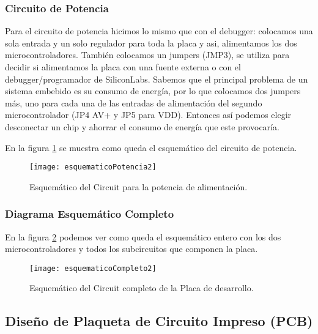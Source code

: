 \subsubsection{Circuito de Potencia}
\label{subsub: circuito_potencia2}

Para el circuito de potencia hicimos lo mismo que con el debugger: colocamos una sola entrada y un solo regulador para toda la placa y asi, alimentamos los dos microcontroladores. También colocamos un jumpers (JMP3), se utiliza para decidir si alimentamos la placa con una fuente externa o con el debugger/programador de SiliconLabs. 
Sabemos que el principal problema de un sistema embebido es su consumo de energía, por lo que colocamos dos jumpers más, uno para cada una de las entradas de alimentación del segundo microcontrolador (JP4 AV+ y JP5 para VDD). Entonces así podemos elegir desconectar un chip y ahorrar el consumo de energía que este provocaría. 

En la figura \ref{fig:esquematicoPotencia2} se muestra como queda el esquemático del circuito de potencia.

\begin{figure}[H] 
\centering
  \texttt{[image: esquematicoPotencia2]}
  \caption{Esquemático del Circuit para la potencia de alimentación.}\label{fig:esquematicoPotencia2}
\end{figure}


\subsubsection{Diagrama Esquemático Completo}
\label{subsubsection: esquematico_completo2}

En la figura \ref{fig:esquematicoCompleto2} podemos ver como queda el esquemático entero con los dos microcontroladores y todos los subcircuitos que componen la placa.

\begin{figure}  
\centering
  \texttt{[image: esquematicoCompleto2]}
  \caption{Esquemático del Circuit completo de la Placa de desarrollo.}\label{fig:esquematicoCompleto2}
\end{figure}




\subsection{Diseño de Plaqueta de Circuito Impreso (PCB)}
\label{ subsection: diseño_pcb2}

